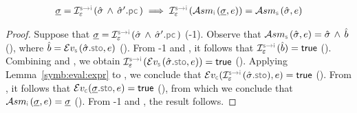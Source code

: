 \begin{lemma}\label{lemma:soundiness:assume}
$$
\begin{array}{l}
\istate = \interpret{\symbinst}{\senv}(\sstate \, \wedge \, \sstate'.\pcsel)  
       \implies  \interpret{\symbinst}{\senv}(\absassume{\instrumented}(\istate, \jsilexpr)) = \absassume{\symbolic}(\sstate, \jsilexpr) 
\end{array}
$$
\end{lemma}
\begin{proof}
Suppose that $\istate = \interpret{\symbinst}{\senv}(\sstate \, \wedge \, \sstate'.\pcsel)$ (\hyp{1}).
Observe that $\absassume{\symbolic}(\sstate, \jsilexpr) = \sstate \, \wedge \, \sexprb$ (), where 
$\sexprb = \evalexpr{\symbolic}(\sstate.\stosel, \jsilexpr)$ (). 
From \hyp{1} and , it follows that $\interpret{\symbinst}{\senv}(\sexprb) = \jtrue$ (). 
Combining  and , we obtain $\interpret{\symbinst}{\senv}( \evalexpr{\symbolic}(\sstate.\stosel, \jsilexpr)) = \jtrue$ (). 
Applying Lemma~\ref{symb:eval:expr} to , we conclude that
$\evalexpr{\concrete}(\interpret{\symbinst}{\senv}(\sstate.\stosel), \jsilexpr) = \jtrue$ (). 
From , it follows that $\evalexpr{\concrete}(\istate.\stosel, \jsilexpr) = \jtrue$ (), 
from which we conclude that $\absassume{\instrumented}(\istate, \jsilexpr) = \istate$ (). 
From \hyp{1} and , the result follows. 
\end{proof}


